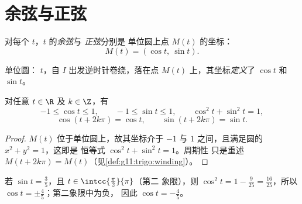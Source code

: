 \section{余弦与正弦}

\begin{definition}[余弦与正弦]\label{def:g11:trigo:cossin}
对每个 $t$，$t$ 的\emph{余弦}与
\emph{正弦}分别是
单位圆上点 $M(t)$ 的坐标：
\[
M(t) = (\cos t,\ \sin t).
\]
\end{definition}

\begin{omfigure}

{\small 单位圆： $t$，自
$I$ 出发逆时针卷绕，落在点 $M(t)$ 上，其坐标\emph{定义}了 $\cos t$
和 $\sin t$。}
\end{omfigure}

\begin{proposition}[基本性质]\label{prop:g11:trigo:first}
对任意 $t \in \R$ 及 $k \in \Z$，有
\[
-1 \leq \cos t \leq 1, \qquad
-1 \leq \sin t \leq 1, \qquad
\cos^2 t + \sin^2 t = 1,
\]
\[
\cos(t + 2k\pi) = \cos t, \qquad \sin(t + 2k\pi) = \sin t .
\]
\end{proposition}

\begin{proof}
$M(t)$ 位于单位圆上，故其坐标介于 $-1$ 与
$1$ 之间，且满足圆的 $x^2 + y^2 = 1$，这即是
恒等式 $\cos^2 t + \sin^2 t = 1$。周期性
只是重述 $M(t + 2k\pi) = M(t)$（见\cref{def:g11:trigo:winding}）。
\end{proof}

\begin{example}\label{ex:g11:trigo:identity}
若 $\sin t = \frac35$，且 $t \in \intcc{\frac\pi2}{\pi}$（第二
象限），则 $\cos^2 t = 1 - \frac{9}{25} = \frac{16}{25}$，所以
$\cos t = \pm\frac45$；第二象限中为负，
因此 $\cos t = -\frac45$。
\end{example}

